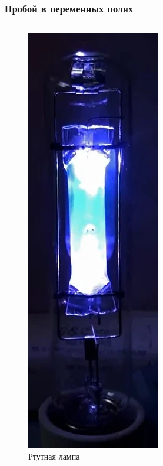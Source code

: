 \documentclass{beamer}
\begin{document}
	\begin{frame}
		\frametitle{Пробой в переменных полях}
		
		\begin{columns}
			\begin{figure}
				\centering
				\includegraphics[width=1\linewidth]{res/hg_lamp.png}
				\caption*{Ртутная лампа}
			\end{figure}
			

\end{columns}
\end{frame}
\end{document}
